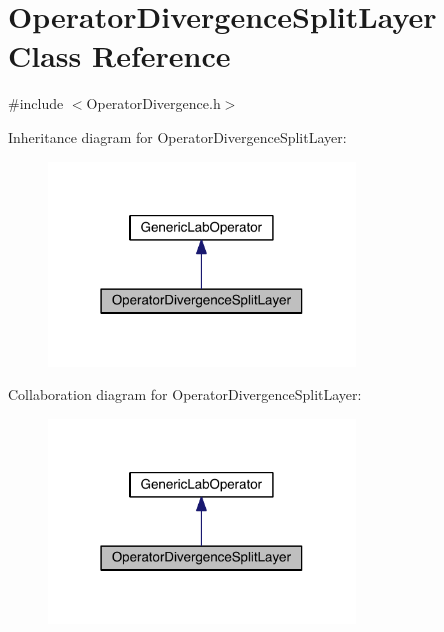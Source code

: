 \hypertarget{class_operator_divergence_split_layer}{}\section{Operator\+Divergence\+Split\+Layer Class Reference}
\label{class_operator_divergence_split_layer}


{\ttfamily \#include $<$Operator\+Divergence.\+h$>$}



Inheritance diagram for Operator\+Divergence\+Split\+Layer\+:\nopagebreak
\begin{figure}[H]
\begin{center}
\leavevmode
\includegraphics[width=231pt]{d1/dc4/class_operator_divergence_split_layer__inherit__graph}
\end{center}
\end{figure}


Collaboration diagram for Operator\+Divergence\+Split\+Layer\+:\nopagebreak
\begin{figure}[H]
\begin{center}
\leavevmode
\includegraphics[width=231pt]{d4/d38/class_operator_divergence_split_layer__coll__graph}
\end{center}
\end{figure}
